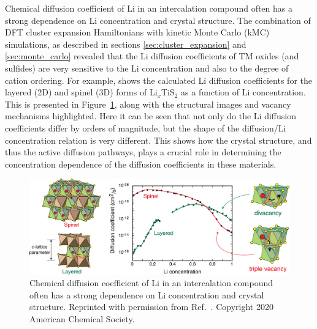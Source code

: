\documentclass[../main.tex]{subfiles}
\begin{document}
Chemical diffusion coefficient of Li in an intercalation compound often has a strong dependence on Li concentration and crystal structure. The combination of DFT cluster expansion Hamiltonians with kinetic Monte Carlo (kMC) simulations, as described in sections \ref{sec:cluster_expansion} and \ref{sec:monte_carlo} revealed that the Li diffusion coefficients of TM oxides (and sulfides) are very sensitive to the Li concentration and also to the degree of cation ordering. \cite{van2008nondilute,VanderVen2001, bhattacharya2011first, bhattacharya2010phase, VanDerVen2013} For example, \citeauthor{VanderVen2020} shows the calculated Li diffusion coefficients for the layered (2D) and spinel (3D) forms of Li$_x$TiS$_2$ as a function of Li concentration. \cite{VanderVen2020,VanDerVen2013,van2008nondilute,bhattacharya2011first} This is presented in Figure~\ref{fig:LixTiS2_diffusion}, along with the structural images and vacancy mechanisms highlighted. Here it can be seen that not only do the Li diffusion coefficients differ by orders of magnitude, but the shape of the diffusion/Li concentration relation is very different. This shows how the crystal structure, and thus the active diffusion pathways, plays a crucial role in determining the concentration dependence of the diffusion coefficients in these materials.

\begin{figure}
    \centering
    \includegraphics[scale=0.26]{figures/LixTiS2_diffusion.jpeg}
    \caption{Chemical diffusion coefficient of Li in an intercalation compound often has a strong dependence on Li concentration and crystal structure. Reprinted with permission from Ref.~. Copyright 2020 American Chemical Society.}
    \label{fig:LixTiS2_diffusion}
\end{figure}
\end{document}
